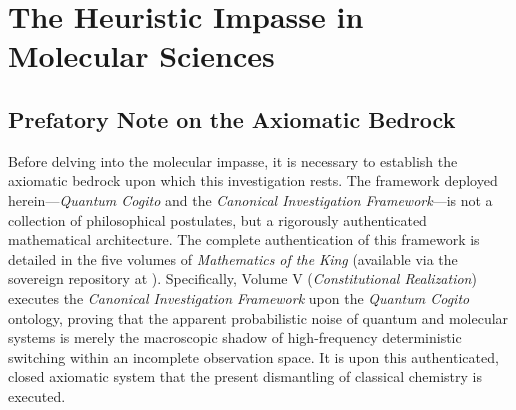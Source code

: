 \documentclass[11pt,openany]{extbook}
\theoremstyle{plain}
\theoremstyle{definition}
\begin{document}
\chapter{The Heuristic Impasse in Molecular Sciences}

\section*{Prefatory Note on the Axiomatic Bedrock}
Before delving into the molecular impasse, it is necessary to establish the axiomatic bedrock upon which this investigation rests. The framework deployed herein---\emph{Quantum Cogito} and the \emph{Canonical Investigation Framework}---is not a collection of philosophical postulates, but a rigorously authenticated mathematical architecture. The complete authentication of this framework is detailed in the five volumes of \emph{Mathematics of the King} (available via the sovereign repository at ). Specifically, Volume V (\emph{Constitutional Realization}) executes the \emph{Canonical Investigation Framework} upon the \emph{Quantum Cogito} ontology, proving that the apparent probabilistic noise of quantum and molecular systems is merely the macroscopic shadow of high-frequency deterministic switching within an incomplete observation space. It is upon this authenticated, closed axiomatic system that the present dismantling of classical chemistry is executed.
\end{document}
